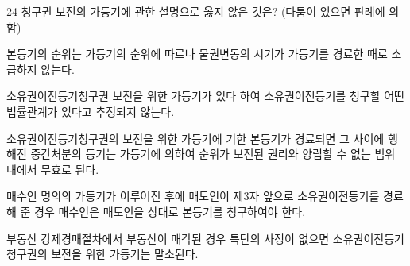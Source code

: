 \begin{question}{24}
청구권 보전의 가등기에 관한 설명으로 옳지 않은 것은? (다툼이 있으면 판례에 의함)
\begin{choices}
  \item 본등기의 순위는 가등기의 순위에 따르나 물권변동의 시기가 가등기를 경료한 때로 소급하지 않는다.
  \item 소유권이전등기청구권 보전을 위한 가등기가 있다 하여 소유권이전등기를 청구할 어떤 법률관계가 있다고 추정되지 않는다.
  \item 소유권이전등기청구권의 보전을 위한 가등기에 기한 본등기가 경료되면 그 사이에 행해진 중간처분의 등기는 가등기에 의하여 순위가 보전된 권리와 양립할 수 없는 범위 내에서 무효로 된다.
  \item 매수인 명의의 가등기가 이루어진 후에 매도인이 제3자 앞으로 소유권이전등기를 경료해 준 경우 매수인은 매도인을 상대로 본등기를 청구하여야 한다.
  \item 부동산 강제경매절차에서 부동산이 매각된 경우 특단의 사정이 없으면 소유권이전등기청구권의 보전을 위한 가등기는 말소된다.
\end{choices}
\end{question}
